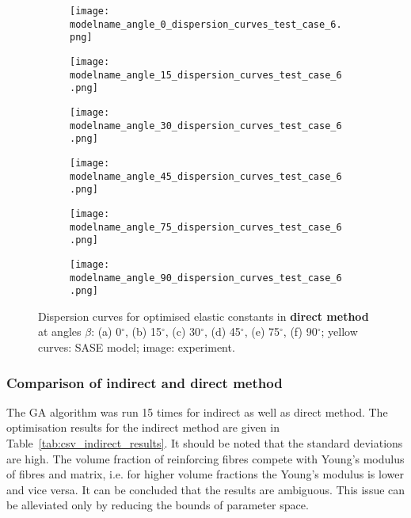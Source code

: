 \documentclass[preprint,12pt]{elsarticle}
\begin{document}
\begin{figure} [h!]
	\newcommand{\modelname}{ga_plain_weave_C_tensor_known_mass_50}
	\centering
	\begin{subfigure}[b]{0.49\textwidth}
		\centering
		\texttt{[image: \\modelname\_angle\_0\_dispersion\_curves\_test\_case\_6.png]}
		\caption{}
		\label{fig:dispersion0deg_direct}
	\end{subfigure}
	\begin{subfigure}[b]{0.49\textwidth}
		\centering
		\texttt{[image: \\modelname\_angle\_15\_dispersion\_curves\_test\_case\_6.png]}
		\caption{}
		\label{fig:dispersion15deg_direct}
	\end{subfigure}
	\begin{subfigure}[b]{0.49\textwidth}
		\centering
		\texttt{[image: \\modelname\_angle\_30\_dispersion\_curves\_test\_case\_6.png]}
		\caption{}
		\label{fig:dispersion30deg_direct}
	\end{subfigure}
	\begin{subfigure}[b]{0.49\textwidth}
		\centering
		\texttt{[image: \\modelname\_angle\_45\_dispersion\_curves\_test\_case\_6.png]}
		\caption{}
		\label{fig:dispersion45deg_direct}
	\end{subfigure}
	\begin{subfigure}[b]{0.49\textwidth}
		\centering
		\texttt{[image: \\modelname\_angle\_75\_dispersion\_curves\_test\_case\_6.png]}
		\caption{}
		\label{fig:dispersion75deg_direct}
	\end{subfigure}
	\begin{subfigure}[b]{0.49\textwidth}
		\centering
		\texttt{[image: \\modelname\_angle\_90\_dispersion\_curves\_test\_case\_6.png]}
		\caption{}
		\label{fig:dispersion90deg_direct}
	\end{subfigure}
	\caption{Dispersion curves for optimised elastic constants in \textbf{direct method} at angles $\beta$: (a) 0$^{\circ}$, (b) 15$^{\circ}$, (c) 30$^{\circ}$, (d) 45$^{\circ}$, (e) 75$^{\circ}$, (f) 90$^{\circ}$; yellow curves: SASE model; image: experiment. }
	\label{fig:optimized_direct}
\end{figure}

\clearpage
\subsubsection{Comparison of indirect and direct method}
The GA algorithm was run 15 times for indirect as well as direct method. The optimisation results for the indirect  method are given in Table~\ref{tab:csv_indirect_results}. It should be noted that the standard deviations are high. The volume fraction of reinforcing fibres compete with Young’s modulus of fibres and matrix, i.e. for higher volume fractions the Young’s modulus is lower and vice versa. It can be concluded that the results are ambiguous. This issue can be alleviated only by reducing the bounds of parameter space.
\end{document}
